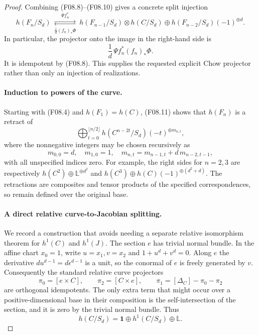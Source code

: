 \documentclass[11pt]{article}
\theoremstyle{remark}\newtheorem{remark}[theorem]{Remark}
\begin{document}
\begin{proof}
Combining (F08.8)--(F08.10) gives a concrete split injection
\[
 h(F_n/S_d)\ 
 \underset{\frac1d(f_n)_*\Phi}{\stackrel{\Psi f_n^*}{\rightleftarrows}}\ 
 h(F_{n-1}/S_d)\otimes h(C/S_d)
       \oplus h(F_{n-2}/S_d)(-1)^{\oplus d}.
 \tag{F08.11}
\]
In particular, the projector onto the image in the right-hand
side is
\[
 \frac1d\,\Psi f_n^*(f_n)_*\Phi.
 \tag{F08.12}
\]
It is idempotent by (F08.8). This supplies the requested explicit
Chow projector rather than only an injection of realizations.

\paragraph{Induction to powers of the curve.}
Starting with (F08.4) and $h(F_1)=h(C)$, (F08.11) shows that
$h(F_n)$ is a retract of
\[
 \bigoplus_{t=0}^{\lfloor n/2\rfloor}
     h(C^{n-2t}/S_d)(-t)^{\oplus m_{n,t}},
 \tag{F08.13}
\]
where the nonnegative integers may be chosen recursively as
\[
 m_{0,0}=d,\quad m_{1,0}=1,\quad
 m_{n,t}=m_{n-1,t}+d\,m_{n-2,t-1},
 \tag{F08.14}
\]
with all unspecified indices zero. For example, the right sides
for $n=2,3$ are respectively
$h(C^2)\oplus\mathbb L^{\oplus d^2}$ and
$h(C^3)\oplus h(C)(-1)^{\oplus(d^2+d)}$.
The retractions are composites and tensor products of the
specified correspondences, so remain defined over the original
base.

\paragraph{A direct relative curve-to-Jacobian splitting.}
We record a construction that avoids needing a separate relative
isomorphism theorem for $h^1(C)$ and $h^1(J)$. The section $e$ has
trivial normal bundle. In the affine chart $x_0=1$, write
$u=x_1,v=x_2$ and $1+u^d+v^d=0$. Along $e$ the derivative
$du^{d-1}=d\epsilon^{d-1}$ is a unit, so the conormal of $e$
is freely generated by $v$. Consequently the standard relative
curve projectors
\[
 \pi_0=[e\times C],\qquad \pi_2=[C\times e],\qquad
 \pi_1=[\Delta_C]-\pi_0-\pi_2
 \tag{F08.15}
\]
are orthogonal idempotents. The only extra term that might occur
over a positive-dimensional base in their composition is the
self-intersection of the section, and it is zero by the trivial
normal bundle. Thus
\[
 h(C/S_d)=\mathbf1\oplus h^1(C/S_d)\oplus\mathbb L.
 \tag{F08.16}
\]


\end{proof}
\end{document}
